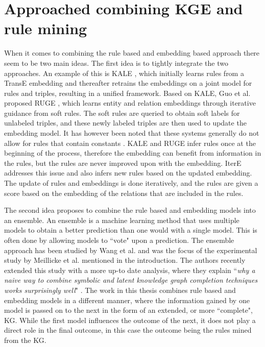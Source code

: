 \section{Approached combining KGE and rule mining}
When it comes to combining the rule based and embedding based approach there seem to be two main ideas. The first idea is to tightly integrate the two approaches. An example of this is KALE \cite{KALE}, which initially learns rules from a TransE embedding and thereafter retrains the embeddings on a joint model for rules and triples, resulting in a unified framework. Based on KALE, Guo et al. proposed RUGE \cite{RUGE}, which learns entity and relation embeddings through iterative guidance from soft rules. The soft rules are queried to obtain soft labels for unlabeled triples, and these newly labeled triples are then used to update the embedding model. It has however been noted that these systems generally do not allow for rules that contain constants \cite{meilicke2021naive}. KALE and RUGE infer rules once at the beginning of the process, therefore the embedding can benefit from information in the rules, but the rules are never improved upon with the embedding. IterE \cite{zhang2019iteratively} addresses this issue and also infers new rules based on the updated embedding. The update of rules and embeddings is done iteratively, and the rules are given a score based on the embedding of the relations that are included in the rules.

The second idea proposes to combine the rule based and embedding models into an ensemble. An ensemble is a machine learning method that uses multiple models to obtain a better prediction than one would with a single model. This is often done by allowing models to ``vote" upon a prediction. The ensemble approach has been studied by Wang et al. \cite{wang2018multi} and was the focus of the experimental study by Meillicke et al. \cite{ensemble} mentioned in the introduction. The authors recently extended this study with a more up-to date analysis, where they explain ``\textit{why a naive way to combine symbolic and latent knowledge graph completion techniques works surprisingly well}" \cite{meilicke2021naive}. The work in this thesis combines rule based and embedding models in a different manner, where the information gained by one model is passed on to the next in the form of an extended, or more ``complete", KG. While the first model influences the outcome of the next, it does not play a direct role in the final outcome, in this case the outcome being the rules mined from the KG.

